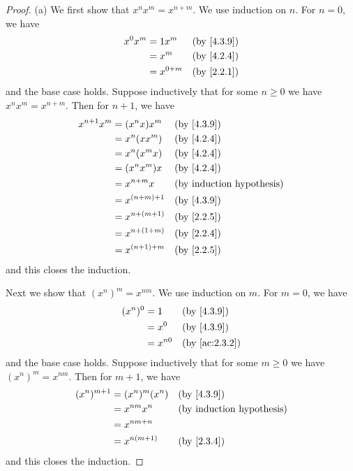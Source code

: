 \begin{proof}{(a)}
	We first show that \(x^n x^m = x^{n + m}\).
	We use induction on \(n\).
	For \(n = 0\), we have
	\begin{align*}
		x^0 x^m & = 1 x^m     &  & \by{4.3.9} \\
		        & = x^m       &  & \by{4.2.4} \\
		        & = x^{0 + m} &  & \by{2.2.1}
	\end{align*}
	and the base case holds.
	Suppose inductively that for some \(n \geq 0\) we have \(x^n x^m = x^{n + m}\).
	Then for \(n + 1\), we have
	\begin{align*}
		x^{n + 1} x^m & = (x^n x) x^m     &  & \by{4.3.9} \\
		              & = x^n (x x^m)     &  & \by{4.2.4} \\
		              & = x^n (x^m x)     &  & \by{4.2.4} \\
		              & = (x^n x^m) x     &  & \by{4.2.4} \\
		              & = x^{n + m} x     &  & \byIH      \\
		              & = x^{(n + m) + 1} &  & \by{4.3.9} \\
		              & = x^{n + (m + 1)} &  & \by{2.2.5} \\
		              & = x^{n + (1 + m)} &  & \by{2.2.4} \\
		              & = x^{(n + 1) + m} &  & \by{2.2.5}
	\end{align*}
	and this closes the induction.

	Next we show that \((x^n)^m = x^{nm}\).
	We use induction on \(m\).
	For \(m = 0\), we have
	\begin{align*}
		(x^n)^0 & = 1      &  & \by{4.3.9}    \\
		        & = x^0    &  & \by{4.3.9}    \\
		        & = x^{n0} &  & \by{ac:2.3.2}
	\end{align*}
	and the base case holds.
	Suppose inductively that for some \(m \geq 0\) we have \((x^n)^m = x^{nm}\).
	Then for \(m + 1\), we have
	\begin{align*}
		(x^n)^{m + 1} & = (x^n)^m (x^n) &  & \by{4.3.9} \\
		              & = x^{nm} x^n    &  & \byIH      \\
		              & = x^{nm + n}                    \\
		              & = x^{n(m + 1)}  &  & \by{2.3.4}
	\end{align*}
	and this closes the induction.


\end{proof}
